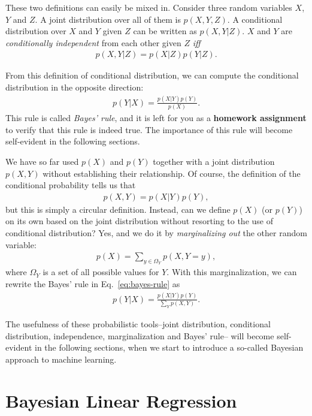 \documentclass{report}
\begin{document}
These two definitions can easily be mixed in. Consider three random variables
$X$, $Y$ and $Z$. A joint distribution over all of them is $p(X, Y, Z)$. A
conditional distribution over $X$ and $Y$ given $Z$ can be written as $p(X,
Y|Z)$. $X$ and $Y$ are {\it conditionally independent} from each other given
$Z$ {\it iff} 
\begin{align}
    \label{eq:cond_ind}
    p(X,Y|Z) = p(X|Z)p(Y|Z). 
\end{align}

From this definition of conditional distribution, we can compute the conditional
distribution in the opposite direction:
\begin{align}
    \label{eq:bayes-rule}
    p(Y|X) = \frac{p(X|Y)p(Y)}{p(X)}.
\end{align}
This rule is called {\it Bayes' rule}, and it is left for you as a {\bf homework
assignment} to verify that this rule is indeed true. The importance of this rule
will become self-evident in the following sections.

We have so far used $p(X)$ and $p(Y)$ together with a joint distribution
$p(X,Y)$ without establishing their relationship. Of course, the definition of
the conditional probability tells us that 
\begin{align*}
    p(X,Y) = p(X|Y)p(Y),
\end{align*}
but this is simply a circular definition. Instead, can we define $p(X)$ (or
$p(Y)$) on its own based on the joint distribution without resorting to the use
of conditional distribution?  Yes, and we do it by {\it marginalizing out} the
other random variable:
\begin{align}
    \label{eq:marginal}
    p(X) = \sum_{y \in \Omega_Y} p(X, Y=y),
\end{align}
where $\Omega_Y$ is a set of all possible values for $Y$. With this
marginalization, we can rewrite the Bayes' rule in Eq.~\eqref{eq:bayes-rule} as
\begin{align*}
    p(Y|X) = \frac{p(X|Y)p(Y)}{\sum_{Y} p(X, Y)}.
\end{align*}

The usefulness of these probabilistic tools--joint distribution, conditional
distribution, independence, marginalization and Bayes' rule-- will become
self-evident in the following sections, when we start to introduce a so-called
Bayesian approach to machine learning.


\section{Bayesian Linear Regression}
\end{document}
